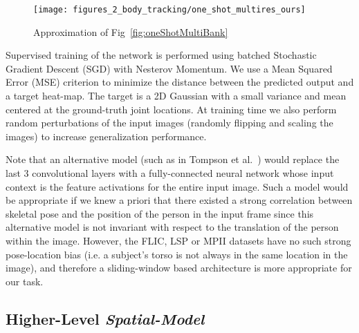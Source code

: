 \begin{figure}[th]
  \centering
    \texttt{[image: figures\_2\_body\_tracking/one\_shot\_multires\_ours]}
    \caption{Approximation of Fig~\ref{fig:oneShotMultiBank}}
  \label{fig:oneShotMultiBankSimplified} 
\end{figure}

Supervised training of the network is performed using batched Stochastic Gradient Descent (SGD) with Nesterov Momentum. We use a Mean Squared Error (MSE) criterion to minimize the distance between the predicted output and a target heat-map. The target is a 2D Gaussian with a small variance and mean centered at the ground-truth joint locations. At training time we also perform random perturbations of the input images (randomly flipping and scaling the images) to increase generalization performance.

Note that an alternative model (such as in Tompson et al.~\cite{tompsonTOG14}) would replace the last 3 convolutional layers with a fully-connected neural network whose input context is the feature activations for the entire input image.  Such a model would be appropriate if we knew a priori that there existed a strong correlation between skeletal pose and the position of the person in the input frame since this alternative model is not invariant with respect to the translation of the person within the image.  However, the FLIC, LSP or MPII datasets have no such strong pose-location bias (i.e. a subject's torso is not always in the same location in the image), and therefore a sliding-window based architecture is more appropriate for our task.

\subsection{Higher-Level \emph{Spatial-Model}}
\label{sec:spatialmodel}

